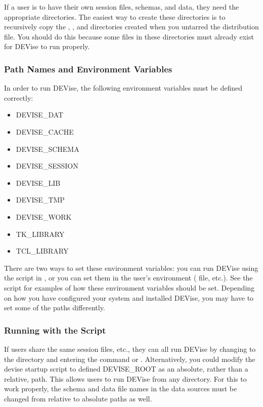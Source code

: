 If a user is to have their own session files, schemas, and data, they need
the appropriate directories.  The easiest way to create these directories
is to recursively copy the , , and
 directories created when you untarred the distribution
file.  You should do this because some files in these directories must
already exist for DEVise to run properly.

\subsubsection{Path Names and Environment Variables}

In order to run DEVise, the following environment variables must be defined correctly:

\begin{itemize}
	\item DEVISE\_DAT
	\item DEVISE\_CACHE
	\item DEVISE\_SCHEMA
	\item DEVISE\_SESSION
	\item DEVISE\_LIB
	\item DEVISE\_TMP
	\item DEVISE\_WORK
	\item TK\_LIBRARY
	\item TCL\_LIBRARY
\end{itemize}

There are two ways to set these environment variables: you can run DEVise using the
 script in , or you can set them in the user's
environment ( file, etc.).  See the  script for
examples of how these environment variables should be set.  Depending on how you
have configured your system and installed DEVise, you may have to set some of the
paths differently.

\subsubsection{Running with the  Script}

If users share the same session files, etc., they can all run DEVise by changing to the
directory  and entering the command  or .
Alternatively, you could modify the devise startup script to defined DEVISE\_ROOT as an
absolute, rather than a relative, path.  This allows users to run DEVise from any directory.
For this to work properly, the schema and data file names in the data sources must be
changed from relative to absolute paths as well.

